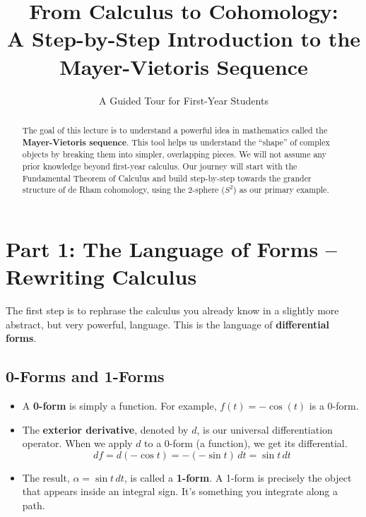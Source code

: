 \documentclass[12pt, letterpaper]{article}
\title{\bfseries From Calculus to Cohomology: \\ \large A Step-by-Step Introduction to the Mayer-Vietoris Sequence}
\author{A Guided Tour for First-Year Students}
\date{}
\begin{document}
	\maketitle
	
	\begin{abstract}
		The goal of this lecture is to understand a powerful idea in mathematics called the \textbf{Mayer-Vietoris sequence}. This tool helps us understand the ``shape'' of complex objects by breaking them into simpler, overlapping pieces. We will not assume any prior knowledge beyond first-year calculus. Our journey will start with the Fundamental Theorem of Calculus and build step-by-step towards the grander structure of de Rham cohomology, using the 2-sphere ($S^2$) as our primary example.
	\end{abstract}
	
	\section{Part 1: The Language of Forms -- Rewriting Calculus}
	
	The first step is to rephrase the calculus you already know in a slightly more abstract, but very powerful, language. This is the language of \textbf{differential forms}.
	
	\subsection{0-Forms and 1-Forms}
	\begin{itemize}
		\item A \textbf{0-form} is simply a function. For example, $f(t) = -\cos(t)$ is a 0-form.
		\item The \textbf{exterior derivative}, denoted by $d$, is our universal differentiation operator. When we apply $d$ to a 0-form (a function), we get its differential.
		\begin{equation*}
			d f = d(-\cos t) = -(-\sin t) \, dt = \sin t \, dt
		\end{equation*}
		\item The result, $\alpha = \sin t \, dt$, is called a \textbf{1-form}. A 1-form is precisely the object that appears inside an integral sign. It's something you integrate along a path.
	\end{itemize}
	
\end{document}
